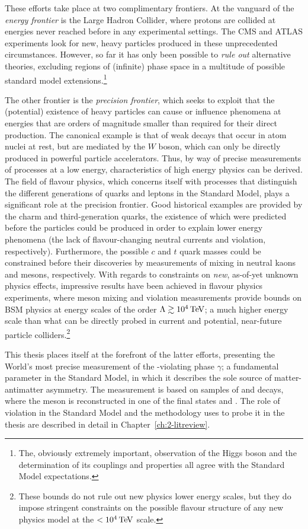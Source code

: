 These efforts take place at two complimentary frontiers. At the vanguard of the \emph{energy frontier} is the Large Hadron Collider, where protons are collided at energies never reached before in any experimental settings. The CMS and ATLAS experiments look for new, heavy particles produced in these unprecedented circumstances. However, so far it has only been possible to \emph{rule out} alternative theories, excluding regions of (infinite) phase space in a multitude of possible standard model extensions.\footnote{The, obviously extremely important, observation of the Higgs boson and the determination of its couplings and properties all agree with the Standard Model expectations.} 

The other frontier is the \emph{precision frontier}, which seeks to exploit that the (potential) existence of heavy particles can cause or influence phenomena at energies that are orders of magnitude smaller than required for their direct production. The canonical example is that of weak decays that occur in atom nuclei at rest, but are mediated by the $W$ boson, which can only be directly produced in powerful particle accelerators. Thus, by way of precise measurements of processes at a low energy, characteristics of high energy physics can be derived. The field of flavour physics, which concerns itself with processes that distinguish the different generations of quarks and leptons in the Standard Model, plays a significant role at the precision frontier. Good historical examples are provided by the charm and third-generation quarks, the existence of which were predicted before the particles could be produced in order to explain lower energy phenomena (the lack of flavour-changing neutral currents and \CP violation, respectively). Furthermore, the possible $c$ and $t$ quark masses could be constrained before their discoveries by measurements of mixing in neutral kaons and \B mesons, respectively. With regards to constraints on \emph{new}, as-of-yet unknown physics effects, impressive results have been achieved in flavour physics experiments, where meson mixing and \CP violation measurements provide bounds on BSM physics at energy scales of the order $\Lambda \gtrsim 10^{4}\text{\,Te\kern -0.1em V}$; a much higher energy scale than what can be directly probed in current and potential, near-future particle colliders.\footnote{These bounds do not rule out new physics lower energy scales, but they do impose stringent constraints on the possible flavour structure of any new physics model at the $<10^{4}\text{\,Te\kern -0.1em V}$ scale.}

This thesis places itself at the forefront of the latter efforts, presenting the World's most precise measurement of the \CP-violating phase $\gamma$; a fundamental parameter in the Standard Model, in which it describes the sole source of matter-antimatter asymmetry. The measurement is based on samples of \BtoDK and \BtoDpi decays, where the \D meson is reconstructed in one of the final states \Kspipi and \KsKK. The role of \CP violation in the Standard Model and the methodology uses to probe it in the thesis are described in detail in Chapter~\ref{ch:2-litreview}.

